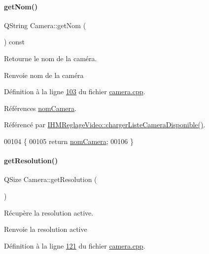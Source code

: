 \paragraph{\texorpdfstring{get\+Nom()}{getNom()}}
{\footnotesize\ttfamily Q\+String Camera\+::get\+Nom (\begin{DoxyParamCaption}{ }\end{DoxyParamCaption}) const}



Retourne le nom de la caméra. 

\begin{DoxyReturn}{Renvoie}
nom de la caméra 
\end{DoxyReturn}


Définition à la ligne \hyperlink{camera_8cpp_source_l00103}{103} du fichier \hyperlink{camera_8cpp_source}{camera.\+cpp}.



Références \hyperlink{camera_8h_source_l00063}{nom\+Camera}.



Référencé par \hyperlink{ihmreglagevideo_8cpp_source_l00132}{I\+H\+M\+Reglage\+Video\+::charger\+Liste\+Camera\+Disponible()}.


\begin{DoxyCode}
00104 \{
00105     \textcolor{keywordflow}{return} \hyperlink{class_camera_ac1cdaf82921d2a2f3f941d867718eba2}{nomCamera};
00106 \}
\end{DoxyCode}
\mbox{\label{class_camera_a9fae9d9b6fa352ff96c9874d9b085454}} 
\paragraph{\texorpdfstring{get\+Resolution()}{getResolution()}}
{\footnotesize\ttfamily Q\+Size Camera\+::get\+Resolution (\begin{DoxyParamCaption}{ }\end{DoxyParamCaption})}



Récupère la resolution active. 

\begin{DoxyReturn}{Renvoie}
la resolution active 
\end{DoxyReturn}


Définition à la ligne \hyperlink{camera_8cpp_source_l00121}{121} du fichier \hyperlink{camera_8cpp_source}{camera.\+cpp}.



